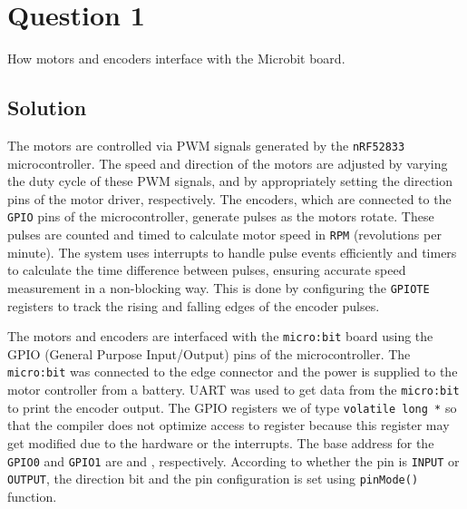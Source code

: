 \section*{Question 1}

How motors and encoders interface with the Microbit board.

\subsection*{Solution}

The motors are controlled via PWM signals generated by the \texttt{nRF52833} microcontroller.
The speed and direction of the motors are adjusted by varying the duty cycle of these PWM signals, and by appropriately setting the direction pins of the motor driver, respectively.
The encoders, which are connected to the \texttt{GPIO} pins of the microcontroller, generate pulses as the motors rotate.
These pulses are counted and timed to calculate motor speed in \texttt{RPM} (revolutions per minute).
The system uses interrupts to handle pulse events efficiently and timers to calculate the time difference between pulses, ensuring accurate speed measurement in a non-blocking way.
This is done by configuring the \texttt{GPIOTE} registers to track the rising and falling edges of the encoder pulses.

The motors and encoders are interfaced with the \texttt{micro:bit} board using the GPIO (General Purpose Input/Output) pins of the microcontroller.
The \texttt{micro:bit} was connected to the edge connector and the power is supplied to the motor controller from a battery.
UART was used to get data from the \texttt{micro:bit} to print the encoder output.
The GPIO registers we of type \texttt{volatile long *} so that the compiler does not optimize access to register because this register may get modified due to the hardware or the interrupts.
The base address for the \texttt{GPIO0} and \texttt{GPIO1} are  and , respectively.
According to whether the pin is \texttt{INPUT} or \texttt{OUTPUT}, the direction bit and the pin configuration is set using \texttt{pinMode\@()} function.


